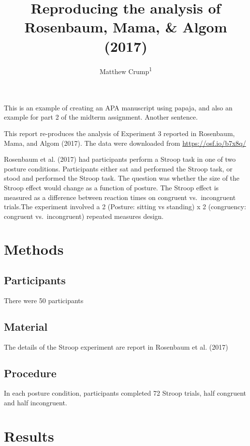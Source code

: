 \documentclass[man]{apa6}
\title{Reproducing the analysis of Rosenbaum, Mama, \& Algom (2017)}
\author{Matthew Crump\textsuperscript{1}}
\date{}
\affiliation{
\vspace{0.5cm}
\textsuperscript{1} Brooklyn College of the City University of New York}
\begin{document}
\maketitle

This is an example of creating an APA manuscript using papaja, and also an example for part 2 of the midterm assignment. Another sentence.

This report re-produces the analysis of Experiment 3 reported in Rosenbaum, Mama, and Algom (2017). The data were downloaded from \url{https://osf.io/b7x8q/}

Rosenbaum et al. (2017) had participants perform a Stroop task in one of two posture conditions. Participants either sat and performed the Stroop task, or stood and performed the Stroop task. The question was whether the size of the Stroop effect would change as a function of posture. The Stroop effect is measured as a difference between reaction times on congruent vs.~incongruent trials.The experiment involved a 2 (Posture: sitting vs standing) x 2 (congruency: congruent vs.~incongruent) repeated measures design.

\hypertarget{methods}{%
\section{Methods}\label{methods}}

\hypertarget{participants}{%
\subsection{Participants}\label{participants}}

There were 50 participants

\hypertarget{material}{%
\subsection{Material}\label{material}}

The details of the Stroop experiment are report in Rosenbaum et al. (2017)

\hypertarget{procedure}{%
\subsection{Procedure}\label{procedure}}

In each posture condition, participants completed 72 Stroop trials, half congruent and half incongruent.

\hypertarget{results}{%
\section{Results}\label{results}}
\end{document}
